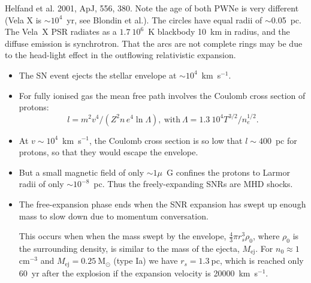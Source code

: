 Helfand et al. 2001, ApJ, 556, 380. Note the age of both PWNe is very
different (Vela X is $\sim 10^4$~yr, see Blondin et al.). The circles
have equal radii of $\sim$0.05~pc. The Vela~X PSR radiates as a
$1.7~10^6$~K blackbody 10~km in radius, and the diffuse emission is
synchrotron. That the arcs are not complete rings may be due to the
head-light effect in the outflowing relativistic expansion.


\begin{itemize}

\item The SN event ejects the stellar envelope at $\sim
  10^4$~km~s$^{-1}$. 

\item For fully ionised gas the mean free path involves the Coulomb
  cross section of protons:
\begin{equation}
  l = m^2 v^4 / (Z^2 n\, e^4  \ln \Lambda ), ~\text{with} ~\Lambda =
1.3~10^4 T^{3/2} / n_e^{1/2}.  \label{eq:coulombfreepath}
\end{equation}

\item At $v\sim 10^4$~km~s$^{-1}$, the Coulomb cross section is so low
  that $l \sim 400$~pc for protons, so that they would escape the
  envelope. 

\item But a small magnetic field of only $\sim 1\mu$~G confines the
protons to Larmor radii of only $\sim 10^{-8}$~pc. Thus the
freely-expanding SNRs are MHD shocks.

\item The free-expansion phase ends when the SNR expansion has swept
  up enough mass to slow down due to momentum conversation. 

This occurs when when the mass swept by the envelope, $\frac{4}{3}\pi
r_s^3 \rho_0$, where $\rho_0$ is the surrounding density, is similar
to the mass of the ejecta, $M_\mathrm{ej}$. For $n_0 \approx
1~$cm$^{-3}$ and $M_\mathrm{ej} = 0.25~$M$_\odot$ (type Ia) we have
$r_s = 1.3~$pc, which is reached only 60~yr after the explosion if the
expansion velocity is 20000~km~s$^{-1}$.


\end{itemize}


